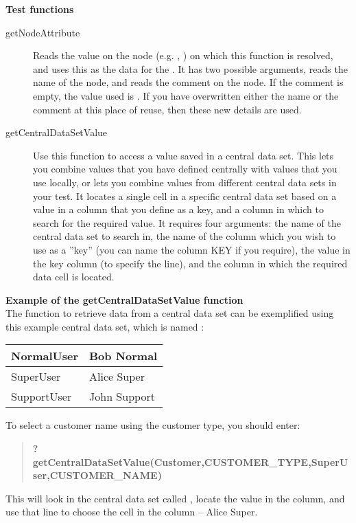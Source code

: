 \textbf{Test functions}\\
\begin{description}
\item [getNodeAttribute]{Reads the value on the node (e.g. \gdcase{}, \gdstep{}) on which this function is resolved, and uses this as the data for the \gdstep{}. It has two possible arguments,  reads the name of the node, and  reads the comment on the node. If the comment is empty, the value used is . If you have overwritten either the name or the comment at this place of reuse, then these new details are used.} 
\item [getCentralDataSetValue]{Use this function to access a value saved in a central data set. This lets you combine values that you have defined centrally with values that you use locally, or lets you combine values from different central data sets in your test. It locates a single cell in a specific central data set based on a value in a column that you define as a key, and a column in which to search for the required value. It requires four arguments: the name of the central data set to search in, the name of the column which you wish to use as a ''key'' (you can name the column KEY if you require), the value in the key column (to specify the line), and the column in which the required data cell is located.}
\end{description}

\textbf{Example of the getCentralDataSetValue function}\\
The function to retrieve data from a central data set can be exemplified using this example central data set, which is named :

\begin{supertabular}{|p{6.0cm}p{6.0cm}|}
\hline
NormalUser & Bob Normal\\
\hline
SuperUser & Alice Super\\
\hline
SupportUser & John Support \\
\hline
\end{supertabular}

 To select a customer name using the customer type, you should enter:
\begin{quote}
\textbf{?getCentralDataSetValue(Customer,CUSTOMER\_TYPE,SuperUser,CUSTOMER\_NAME)}
\end{quote}
This will look in the central data set called , locate the value  in the  column, and use that line to choose the cell in the  column -- Alice Super. 

